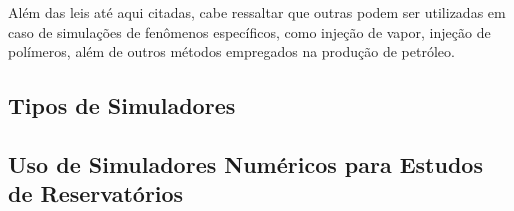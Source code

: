 Além das leis até aqui citadas, cabe ressaltar que outras podem ser utilizadas em caso de simulações de fenômenos específicos, como injeção de vapor, injeção de polímeros, além de outros métodos empregados na produção de petróleo.

\subsection{Tipos de Simuladores}

\subsection{Uso de Simuladores Numéricos para Estudos de Reservatórios}